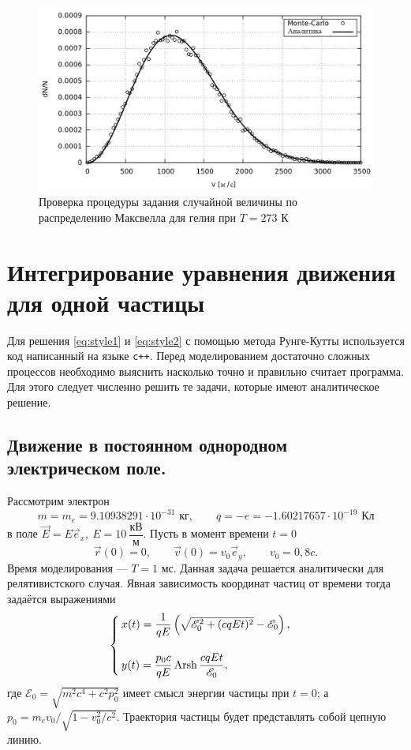 \begin{figure}[h!]
\centering
\includegraphics[width=0.85\linewidth]{./fig/ch4/He(T=273)}
\caption{Проверка процедуры задания случайной величины по распределению Максвелла для гелия при $T = 273 \text{ К}$}
\label{fig:He(T=273)}
\end{figure}


\section{Интегрирование уравнения движения для одной частицы}

Для решения \eqref{eq:style1} и \eqref{eq:style2} с помощью метода Рунге-Кутты используется код написанный на языке \texttt{c++}.
Перед моделированием достаточно сложных процессов необходимо выяснить насколько точно и правильно считает программа.
Для этого следует численно решить те задачи, которые имеют аналитическое решение.

\subsection{Движение в постоянном однородном электрическом поле.}

Рассмотрим электрон
\begin{equation*}
m = m_e = 9.10938291 \cdot 10^{-31} \text{ кг}, \qquad q = -e = - 1.60217657 \cdot 10^{-19} \text{ Кл}
\end{equation*}
 в поле
$
\vec{E} = E \vec{e}_x
,\ 
E = 10\ \dfrac{\text{кВ}}{\text{м}}$. Пусть в момент времени $t=0$
\begin{equation*}
\vec{r}(0) = 0, \qquad \vec{v}(0) = v_0 \vec{e}_y, \qquad v_0 = 0,8c.
\end{equation*}
Время моделирования --- $T = 1 \text{ мс}$. Данная задача решается аналитически для релятивистского случая. Явная зависимость координат частиц от времени тогда задаётся выражениями
\begin{equation}
	\begin{cases}
		x(t) = \dfrac{1}{qE} \left(\sqrt{\mathscr{E}_0^2 + (cqEt)^2 } - \mathscr{E}_0 \right),  \\ \\
		y(t) = \dfrac{p_0c}{qE} \operatorname{Arsh} \dfrac{cqEt}{\mathscr{E}_0},
	\end{cases}
	\label{eq:analytical1}
\end{equation}
где $\mathscr{E}_0  = \sqrt{m^2c^4 + c^2 p_0^2}$ имеет смысл энергии частицы при $t = 0$; а $p_0 = m_e v_0 / \sqrt{1 - v^2_0/c^2}$.
Траектория частицы будет представлять собой цепную линию.


